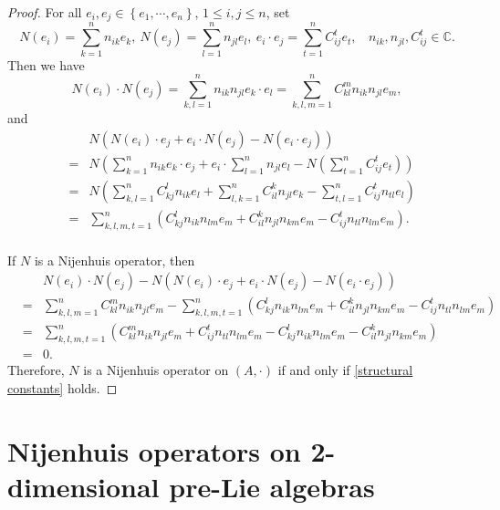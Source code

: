 \documentclass[12pt, reqno]{amsart}
\theoremstyle{plain}
\begin{document}
\begin{proof}
 For all $e_{i}, e_{j} \in \left\{e_{1}, \cdots, e_{n}\right\}$, $1\leq i, j\leq n$, set
 \begin{equation*}
N\left(e_{i}\right)=\sum_{k=1}^{n} n_{i k} e_{k},~N\left(e_{j}\right)=\sum_{l=1}^{n} n_{j l} e_{l},~ e_{i} \cdot e_{j}=\sum_{t=1}^{n} C_{i j}^{t} e_{t},~~~~ n_{i k},n_{j l},C_{i j}^{t}\in \mathbb{C}.
 \end{equation*}
Then we have
 \begin{equation*}
  N(e_{i}) \cdot N(e_{j})=\sum_{k,l=1}^{n} n_{i k}n_{j l} e_{k}\cdot e_{l}=\sum_{k,l,m=1}^{n}C_{k l}^{m} n_{i k}n_{j l} e_{m},
 \end{equation*}
and
\begin{eqnarray*}
&&N(N(e_{i}) \cdot  e_{j}+e_{i} \cdot N(e_{j})-N(e_{i} \cdot  e_{j}))\\
&=&N(\sum_{k=1}^{n} n_{i k} e_{k}\cdot e_{j}+e_{i} \cdot \sum_{l=1}^{n} n_{j l} e_{l}-N(\sum_{t=1}^{n} C_{i j}^{t} e_{t}))\\
&=&N(\sum_{k,l=1}^{n}C_{k j}^{l} n_{i k} e_{l}+ \sum_{l,k=1}^{n}C_{i l}^{k} n_{j l} e_{k}-\sum_{t,l=1}^{n} C_{i j}^{t}  n_{t l}e_{l})\\
&=&\sum_{k,l,m,t=1}^{n}(C_{k j}^{l} n_{i k}n_{l m}e_{m}+C_{i l}^{k} n_{j l}n_{k m} e_{m}- C_{i j}^{t}  n_{t l}n_{l m}e_{m}).\\
\end{eqnarray*}

If $N$ is a Nijenhuis operator, then
\begin{eqnarray*}
   && N(e_{i}) \cdot N(e_{j})-N(N(e_{i}) \cdot  e_{j}+e_{i} \cdot N(e_{j})-N(e_{i} \cdot  e_{j})) \\
  &=& \sum_{k,l,m=1}^{n}C_{k l}^{m} n_{i k}n_{j l} e_{m}-\sum_{k,l,m,t=1}^{n}(C_{k j}^{l} n_{i k}n_{l m}e_{m}+C_{i l}^{k} n_{j l}n_{k m} e_{m}- C_{i j}^{t}  n_{t l}n_{l m}e_{m}) \\
  &= & \sum_{k,l,m,t=1}^{n}(C_{k l}^{m} n_{i k}n_{j l} e_{m}+C_{i j}^{t}  n_{t l}n_{l m}e_{m}-C_{k j}^{l} n_{i k}n_{l m}e_{m}-C_{i l}^{k} n_{j l}n_{k m} e_{m}) \\
  &= & 0.
\end{eqnarray*}
Therefore,  $N$ is a Nijenhuis operator  on $(A, \cdot)$ if and only if \eqref{structural constants} holds.
\end{proof}

\section{Nijenhuis operators on 2-dimensional pre-Lie algebras}
\end{document}

